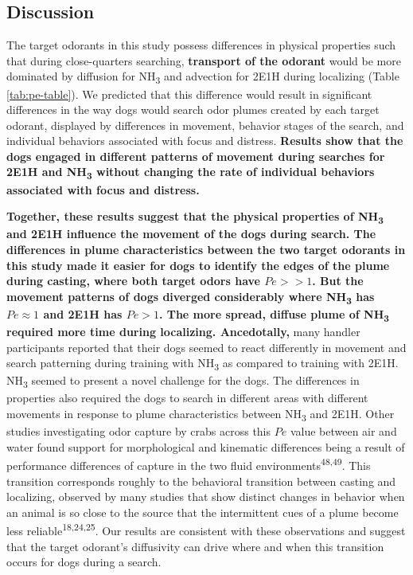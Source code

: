 \documentclass[
]{article}
\begin{document}
\hypertarget{discussion}{%
\subsection{Discussion}\label{discussion}}

The target odorants in this study possess differences in physical properties such that during close-quarters searching, \textbf{transport of the odorant} would be more dominated by diffusion for NH\textsubscript{3} and advection for 2E1H during localizing (Table \ref{tab:pe-table}). We predicted that this difference would result in significant differences in the way dogs would search odor plumes created by each target odorant, displayed by differences in movement, behavior stages of the search, and individual behaviors associated with focus and distress. \textbf{Results show that the dogs engaged in different patterns of movement during searches for 2E1H and NH\textsubscript{3} without changing the rate of individual behaviors associated with focus and distress.}

\textbf{Together, these results suggest that the physical properties of NH\textsubscript{3} and 2E1H influence the movement of the dogs during search. The differences in plume characteristics between the two target odorants in this study made it easier for dogs to identify the edges of the plume during casting, where both target odors have \(Pe >> 1\). But the movement patterns of dogs diverged considerably where NH\textsubscript{3} has \(Pe \approx 1\) and 2E1H has \(Pe > 1\). The more spread, diffuse plume of NH\textsubscript{3} required more time during localizing. Ancedotally,} many handler participants reported that their dogs seemed to react differently in movement and search patterning during training with NH\textsubscript{3} as compared to training with 2E1H. NH\textsubscript{3} seemed to present a novel challenge for the dogs. The differences in properties also required the dogs to search in different areas with different movements in response to plume characteristics between NH\textsubscript{3} and 2E1H. Other studies investigating odor capture by crabs across this \(Pe\) value between air and water found support for morphological and kinematic differences being a result of performance differences of capture in the two fluid environments\textsuperscript{48,49}. This transition corresponds roughly to the behavioral transition between casting and localizing, observed by many studies that show distinct changes in behavior when an animal is so close to the source that the intermittent cues of a plume become less reliable\textsuperscript{18,24,25}. Our results are consistent with these observations and suggest that the target odorant's diffusivity can drive where and when this transition occurs for dogs during a search.
\end{document}
